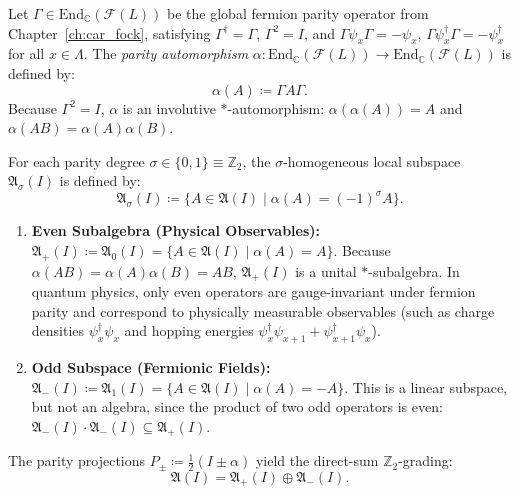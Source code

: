 \begin{definition}
Let $\Gamma \in \mathrm{End}_{\mathbb{C}}(\mathcal{F}(L))$ be the global fermion parity operator from Chapter~\ref{ch:car_fock}, satisfying $\Gamma^\dagger = \Gamma$, $\Gamma^2 = I$, and $\Gamma \psi_x \Gamma = -\psi_x$, $\Gamma \psi_x^\dagger \Gamma = -\psi_x^\dagger$ for all $x \in \Lambda$. The \emph{parity automorphism} $\alpha : \mathrm{End}_{\mathbb{C}}(\mathcal{F}(L)) \to \mathrm{End}_{\mathbb{C}}(\mathcal{F}(L))$ is defined by:
\begin{equation}
\alpha(A) \coloneqq \Gamma A \Gamma.
\end{equation}
Because $\Gamma^2 = I$, $\alpha$ is an involutive $*$-automorphism: $\alpha(\alpha(A)) = A$ and $\alpha(A B) = \alpha(A) \alpha(B)$.
\end{definition}

\begin{definition}
For each parity degree $\sigma \in \{0, 1\} \equiv \mathbb{Z}_2$, the $\sigma$-homogeneous local subspace $\mathfrak{A}_\sigma(I)$ is defined by:
\begin{equation}
\mathfrak{A}_\sigma(I) \coloneqq \{ A \in \mathfrak{A}(I) \mid \alpha(A) = (-1)^\sigma A \}.
\end{equation}
\begin{enumerate}
    \item \textbf{Even Subalgebra (Physical Observables):} $\mathfrak{A}_+(I) \coloneqq \mathfrak{A}_0(I) = \{A \in \mathfrak{A}(I) \mid \alpha(A) = A\}$.
    Because $\alpha(A B) = \alpha(A) \alpha(B) = A B$, $\mathfrak{A}_+(I)$ is a unital $*$-subalgebra. In quantum physics, only even operators are gauge-invariant under fermion parity and correspond to physically measurable observables (such as charge densities $\psi_x^\dagger \psi_x$ and hopping energies $\psi_x^\dagger \psi_{x+1} + \psi_{x+1}^\dagger \psi_x$).
    \item \textbf{Odd Subspace (Fermionic Fields):} $\mathfrak{A}_-(I) \coloneqq \mathfrak{A}_1(I) = \{A \in \mathfrak{A}(I) \mid \alpha(A) = -A\}$.
    This is a linear subspace, but not an algebra, since the product of two odd operators is even: $\mathfrak{A}_-(I) \cdot \mathfrak{A}_-(I) \subseteq \mathfrak{A}_+(I)$.
\end{enumerate}
The parity projections $P_\pm \coloneqq \frac{1}{2}(I \pm \alpha)$ yield the direct-sum $\mathbb{Z}_2$-grading:
\begin{equation}
\mathfrak{A}(I) = \mathfrak{A}_+(I) \oplus \mathfrak{A}_-(I).
\end{equation}
\end{definition}

